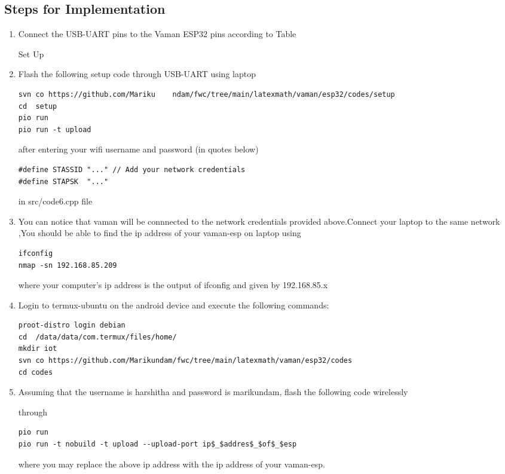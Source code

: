 \documentclass[10pt,a4paper]{article}
\begin{document}
\subsection{Steps for Implementation}
\begin{enumerate}
\item Connect the USB-UART pins to the Vaman ESP32 pins according to Table
\begin{table}[!h]                             
\centering                       
               
\caption{Set Up}              
\label{table:setup}      
\end{table}
 \item Flash the following setup code through USB-UART using laptop
\begin{center}
\end{center}
\begin{center}
\end{center}
\begin{lstlisting}
svn co https://github.com/Mariku    ndam/fwc/tree/main/latexmath/vaman/esp32/codes/setup
cd  setup
pio run
pio run -t upload
\end{lstlisting}
after entering your wifi username and password (in quotes below)
\begin{lstlisting}
#define STASSID "..." // Add your network credentials
#define STAPSK  "..."
\end{lstlisting}
in src/code6.cpp file
\item You can notice that vaman will be connnected to the network credentials provided above.Connect your laptop to the same network ,You should be able to find the ip address of your vaman-esp on laptop using 
\begin{lstlisting}
ifconfig
nmap -sn 192.168.85.209
\end{lstlisting}
where your computer's ip address is the output of ifconfig and given by 192.168.85.x
\item Login to termux-ubuntu on the android device and execute the following commands:
\begin{lstlisting}
proot-distro login debian
cd  /data/data/com.termux/files/home/
mkdir iot
svn co https://github.com/Marikundam/fwc/tree/main/latexmath/vaman/esp32/codes
cd codes
\end{lstlisting}
\item Assuming that the username is harshitha and password is marikundam, flash the following code wirelessly
\begin{center}
\end{center}
through 
\begin{lstlisting}
pio run 
pio run -t nobuild -t upload --upload-port ip$_$addres$_$of$_$esp
\end{lstlisting}
where you may replace the above ip address with the ip address of your vaman-esp.
\end{enumerate}
\end{document}
